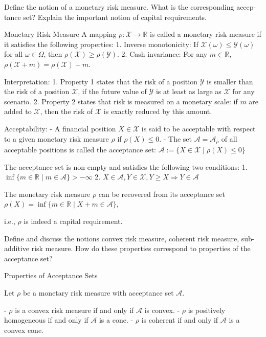 Define the notion of a monetary risk measure. What is the corresponding accep-
tance set? Explain the important notion of capital requirements.

Monetary Risk Measure
A mapping \(\rho : \mathcal{X} \to \mathbb{R}\) is called a monetary risk measure if it satisfies the following properties:  
1. Inverse monotonicity: If \(\mathcal{X}(\omega) \leq \mathcal{Y}(\omega)\) for all \(\omega \in \Omega\), then 
   \(\rho(\mathcal{X}) \geq \rho(\mathcal{Y})\).  
2. Cash invariance: For any \(m \in \mathbb{R}\), \(\rho(\mathcal{X} + m) = \rho(\mathcal{X}) - m\).

Interpretation:  
1. Property 1 states that the risk of a position \(\mathcal{Y}\) is smaller than the risk of a position \(\mathcal{X}\), 
   if the future value of \(\mathcal{Y}\) is at least as large as \(\mathcal{X}\) for any scenario.  
2. Property 2 states that risk is measured on a monetary scale: if \(m\) are added to \(\mathcal{X}\), 
   then the risk of \(\mathcal{X}\) is exactly reduced by this amount.

Acceptability:  
- A financial position \(X \in \mathcal{X}\) is said to be acceptable with respect to a given monetary risk measure \(\rho\) if \(\rho(X) \leq 0\).  
- The set \(\mathcal{A} = \mathcal{A}_{\rho}\) of all acceptable positions is called the acceptance set:  
  \( \mathcal{A} := \{X \in \mathcal{X} \mid \rho(X) \leq 0\} \)

The acceptance set is non-empty and satisfies the following two conditions:  
1. \(\inf \{m \in \mathbb{R} \mid m \in \mathcal{A}\} > -\infty\)  
2. \(X \in \mathcal{A}, Y \in \mathcal{X}, Y \geq X \Rightarrow Y \in \mathcal{A}\)

The monetary risk measure \(\rho\) can be recovered from its acceptance set  
\(\rho(X) = \inf \{m \in \mathbb{R} \mid X + m \in \mathcal{A}\}\),

i.e., \(\rho\) is indeed a capital requirement.


Define and discuss the notions convex risk measure, coherent risk measure, sub-
additive risk measure. How do these properties correspond to properties of the
acceptance set?

Properties of Acceptance Sets

Let \(\rho\) be a monetary risk measure with acceptance set \(\mathcal{A}\).

- \(\rho\) is a convex risk measure if and only if \(\mathcal{A}\) is convex.
- \(\rho\) is positively homogeneous if and only if \(\mathcal{A}\) is a cone.
- \(\rho\) is coherent if and only if \(\mathcal{A}\) is a convex cone.

